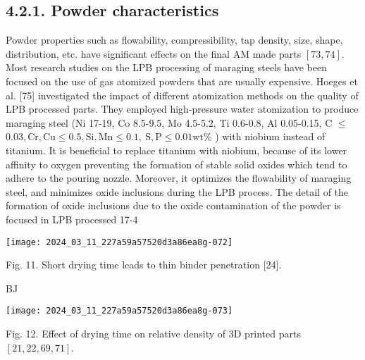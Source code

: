 \documentclass[10pt]{article}
\begin{document}
\subsection*{4.2.1. Powder characteristics}
Powder properties such as flowability, compressibility, tap density, size, shape, distribution, etc. have significant effects on the final AM made parts $[73,74]$. Most research studies on the LPB processing of maraging steels have been focused on the use of gas atomized powders that are usually expensive. Hoeges et al. [75] investigated the impact of different atomization methods on the quality of LPB processed parts. They employed high-pressure water atomization to produce maraging steel (Ni 17-19, Co 8.5-9.5, Mo 4.5-5.2, Ti 0.6-0.8, Al 0.05-0.15, C $\leq$ $0.03, \mathrm{Cr}, \mathrm{Cu} \leq 0.5, \mathrm{Si}, \mathrm{Mn} \leq 0.1, \mathrm{~S}, \mathrm{P} \leq 0.01 \mathrm{wt} \%$ ) with niobium instead of titanium. It is beneficial to replace titanium with niobium, because of its lower affinity to oxygen preventing the formation of stable solid oxides which tend to adhere to the pouring nozzle. Moreover, it optimizes the flowability of maraging steel, and minimizes oxide inclusions during the LPB process. The detail of the formation of oxide inclusions due to the oxide contamination of the powder is focused in LPB processed 17-4

\begin{center}
\texttt{[image: 2024\_03\_11\_227a59a57520d3a86ea8g-072]}
\end{center}

Fig. 11. Short drying time leads to thin binder penetration [24].

BJ

\begin{center}
\texttt{[image: 2024\_03\_11\_227a59a57520d3a86ea8g-073]}
\end{center}

Fig. 12. Effect of drying time on relative density of 3D printed parts $[21,22,69,71]$.
\end{document}
